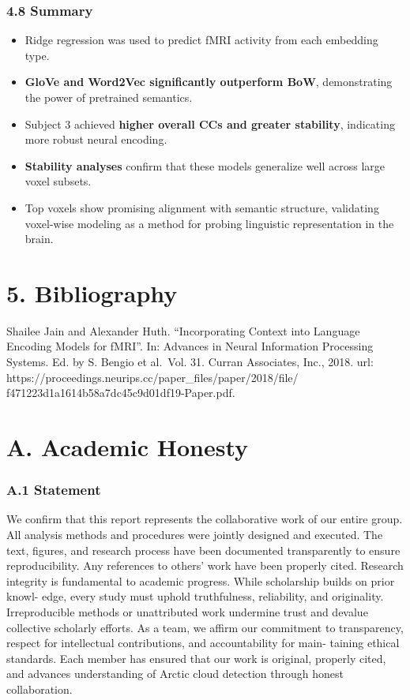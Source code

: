 \documentclass[11pt]{article}
\begin{document}
\hypertarget{summary}{%
\subsubsection{4.8 Summary}\label{summary}}

\begin{itemize}
\item
  Ridge regression was used to predict fMRI activity from each embedding
  type.
\item
  \textbf{GloVe and Word2Vec significantly outperform BoW},
  demonstrating the power of pretrained semantics.
\item
  Subject 3 achieved \textbf{higher overall CCs and greater stability},
  indicating more robust neural encoding.
\item
  \textbf{Stability analyses} confirm that these models generalize well
  across large voxel subsets.
\item
  Top voxels show promising alignment with semantic structure,
  validating voxel-wise modeling as a method for probing linguistic
  representation in the brain.
\end{itemize}

    \hypertarget{bibliography}{%
\section{5. Bibliography}\label{bibliography}}

Shailee Jain and Alexander Huth. ``Incorporating Context into Language
Encoding Models for fMRI''. In: Advances in Neural Information
Processing Systems. Ed. by S. Bengio et al.~Vol. 31. Curran Associates,
Inc., 2018. url:
https://proceedings.neurips.cc/paper\_files/paper/2018/file/
f471223d1a1614b58a7dc45c9d01df19-Paper.pdf.

    \hypertarget{a.-academic-honesty}{%
\section{A. Academic Honesty}\label{a.-academic-honesty}}

\hypertarget{a.1-statement}{%
\subsubsection{A.1 Statement}\label{a.1-statement}}

We confirm that this report represents the collaborative work of our
entire group. All analysis methods and procedures were jointly designed
and executed. The text, figures, and research process have been
documented transparently to ensure reproducibility. Any references to
others' work have been properly cited. Research integrity is fundamental
to academic progress. While scholarship builds on prior knowl- edge,
every study must uphold truthfulness, reliability, and originality.
Irreproducible methods or unattributed work undermine trust and devalue
collective scholarly efforts. As a team, we affirm our commitment to
transparency, respect for intellectual contributions, and accountability
for main- taining ethical standards. Each member has ensured that our
work is original, properly cited, and advances understanding of Arctic
cloud detection through honest collaboration.
\end{document}
